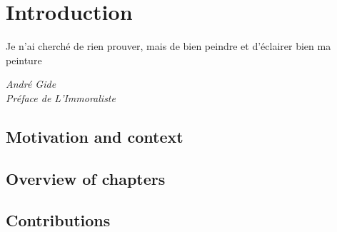 \chapter[Introduction]{Introduction}

\epigraph{Je n’ai cherché de rien prouver, mais de bien peindre et d’éclairer bien ma peinture}{\textit{André Gide \\ Préface de L'Immoraliste}}
\minitoc

\section{Motivation and context}


\section{Overview of chapters}


\section{Contributions}